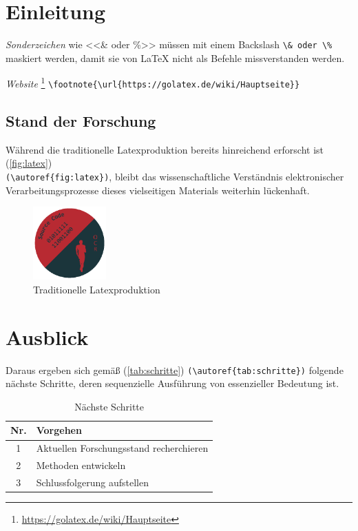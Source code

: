 \section*{Einleitung}

\emph{Sonderzeichen}  wie <<\& oder \%>> müssen mit einem Backslash \verb|\& oder \%| maskiert werden, 
damit sie von LaTeX nicht als Befehle missverstanden werden.


\emph{Website} \footnote{\url{https://golatex.de/wiki/Hauptseite}} \verb|\footnote{\url{https://golatex.de/wiki/Hauptseite}}| 


\clearpage
\subsection*{Stand der Forschung}

Während die traditionelle Latexproduktion bereits hinreichend erforscht ist (\autoref{fig:latex}) \\
\verb|(\autoref{fig:latex})|, bleibt das wissenschaftliche Verständnis elektronischer Verarbeitungsprozesse dieses 
vielseitigen Materials weiterhin lückenhaft. 


\begin{figure}[!ht]%
	\centering
	\includegraphics[width=0.25\textwidth]{images/Logo/logo.eps}
	\caption{Traditionelle Latexproduktion}\label{fig:latex}%
\end{figure}

\clearpage
\section*{Ausblick}

Daraus ergeben sich gemäß (\autoref{tab:schritte}) \verb|(\autoref{tab:schritte})| folgende nächste Schritte, 
deren sequenzielle Ausführung von essenzieller Bedeutung ist.

\begin{table}[!ht]%
	\centering
	\begin{tabular}{@{}cl@{}}%
		\toprule
		\textbf{Nr.} & \textbf{Vorgehen} \\
		\midrule
		1 & Aktuellen Forschungsstand recherchieren \\
		2 & Methoden entwickeln \\
		3 & Schlussfolgerung aufstellen \\
		\bottomrule
	\end{tabular}
	\caption{Nächste Schritte}\label{tab:schritte}
\end{table}

